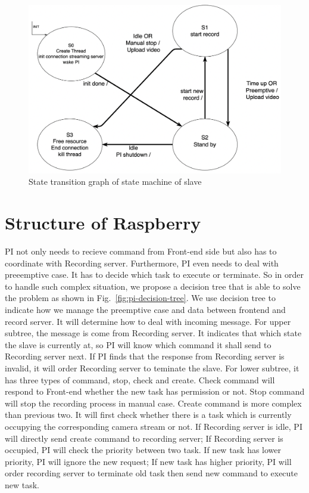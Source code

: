 \begin{figure}[H]
    \centering
    \includegraphics[width=\textwidth]{figsrc/recording-server-stg.png}
    \caption{State transition graph of state machine of slave\label{fig:recording-server-stg}}
\end{figure}

\section{Structure of Raspberry}
PI not only needs to recieve command from Front-end side but also has to coordinate with Recording server. Furthermore, PI even needs to deal with preeemptive case. It has to decide which task to execute or terminate. So in order to handle such complex situation, we propose a decision tree that is able to solve the problem as shown in Fig.~\ref{fig:pi-decision-tree}. We use decision tree to indicate how we manage the preemptive case and data between frontend and record server. It will determine how to deal with incoming message. For upper subtree, the message is come from Recording server. It indicates that which state the slave is currently at, so PI will know which command it shall send to Recording server next. If PI finds that the response from Recording server is invalid, it will order Recording server to teminate the slave. For lower subtree, it has three types of command, stop, check and create. Check command will respond to Front-end whether the new task has permission or not. Stop command will stop the recording process in manual case. Create command is more complex than previous two. It will first check whether there is a task which is currently occupying the corresponding camera stream or not. If Recording server is idle, PI will directly send create command to recording server; If Recording server is occupied, PI will check the priority between two task. If new task has lower priority, PI will ignore the new request; If new task has higher priority, PI will order recording server to terminate old task then send new command to execute new task.

